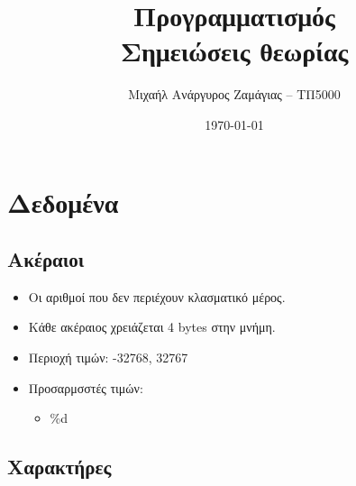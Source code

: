 \documentclass{extreport}
\begin{document}
\title{Προγραμματισμός\\Σημειώσεις θεωρίας}
\author{Μιχαήλ Ανάργυρος Ζαμάγιας -- ΤΠ5000}
\date{\today}

\maketitle

\newpage

\tableofcontents

\newpage

\chapter{Δεδομένα}
\section{Ακέραιοι}
\begin{itemize}
  \item Οι αριθμοί που δεν περιέχουν κλασματικό μέρος.
  \item Κάθε ακέραιος χρειάζεται 4 \foreignlanguage{english}{bytes} στην μνήμη.
  \item Περιοχή τιμών: -32768, 32767
  \item Προσαρμσστές τιμών:
        \begin{itemize}
          \item \%d
        \end{itemize}
\end{itemize}

\section{Χαρακτήρες}
\end{document}

